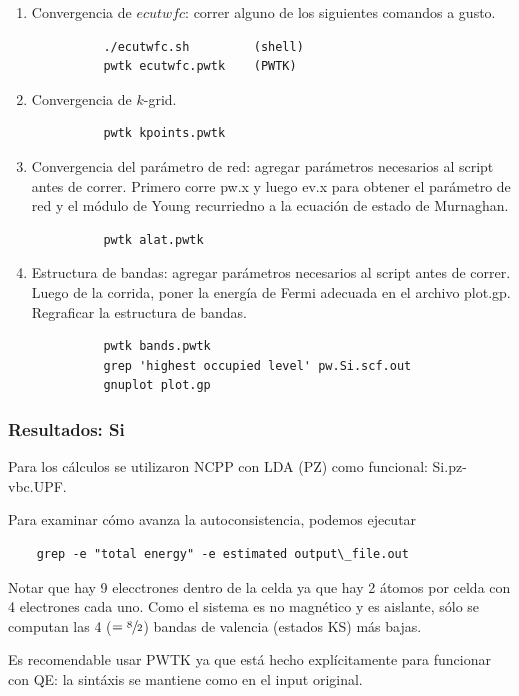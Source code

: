     \begin{enumerate}
      \item Convergencia de $ecutwfc$: correr alguno de los siguientes comandos a gusto.
        \begin{verbatim}
          ./ecutwfc.sh         (shell)
          pwtk ecutwfc.pwtk    (PWTK)
        \end{verbatim}
      \item Convergencia de $k$-grid.
        \begin{verbatim}
          pwtk kpoints.pwtk
        \end{verbatim}
      \item Convergencia del parámetro de red: agregar parámetros necesarios al script antes de correr. Primero corre pw.x y luego ev.x para obtener el parámetro de red y el módulo de Young recurriedno a la ecuación de estado de Murnaghan.
        \begin{verbatim}
          pwtk alat.pwtk
        \end{verbatim}
      \item Estructura de bandas: agregar parámetros necesarios al script antes de correr. Luego de la corrida, poner la energía de Fermi adecuada en el archivo plot.gp. Regraficar la estructura de bandas.
        \begin{verbatim}
          pwtk bands.pwtk
          grep 'highest occupied level' pw.Si.scf.out
          gnuplot plot.gp
        \end{verbatim}
    \end{enumerate}

\subsubsection{Resultados: Si}

  Para los cálculos se utilizaron NCPP con LDA (PZ) como funcional: Si.pz-vbc.UPF.

  Para examinar cómo avanza la autoconsistencia, podemos ejecutar
  \begin{verbatim}
    grep -e "total energy" -e estimated output\_file.out
  \end{verbatim}

  Notar que hay 9 elecctrones dentro de la celda ya que hay 2 átomos por celda con 4 electrones cada uno. Como el sistema es no magnético y es aislante, sólo se computan las 4 ($=\sfrac{8}{2}$) bandas de valencia (estados KS) más bajas.

  Es recomendable usar PWTK ya que está hecho explícitamente para funcionar con QE: la sintáxis se mantiene como en el input original.

